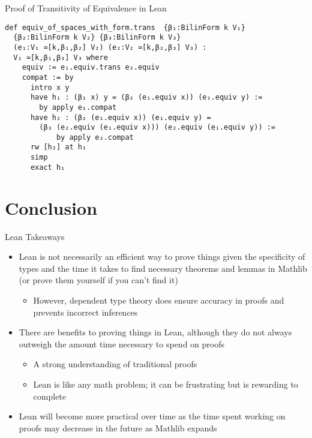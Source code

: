 \documentclass[svgnames]{beamer}
\begin{document}
\begin{frame}[label={sec:proof_comparison},fragile]{Proof of Transitivity of Equivalence in Lean}
\begin{itemize}
\end{itemize}
{\scriptsize
\begin{verbatim}
def equiv_of_spaces_with_form.trans  {β₁:BilinForm k V₁}
  {β₂:BilinForm k V₂} {β₃:BilinForm k V₃} 
  (e₁:V₁ ≃[k,β₁,β₂] V₂) (e₂:V₂ ≃[k,β₂,β₃] V₃) :
  V₁ ≃[k,β₁,β₃] V₃ where
    equiv := e₁.equiv.trans e₂.equiv
    compat := by
      intro x y
      have h₁ : (β₁ x) y = (β₂ (e₁.equiv x)) (e₁.equiv y) :=
        by apply e₁.compat
      have h₂ : (β₂ (e₁.equiv x)) (e₁.equiv y) = 
        (β₃ (e₂.equiv (e₁.equiv x))) (e₂.equiv (e₁.equiv y)) :=
            by apply e₂.compat
      rw [h₂] at h₁
      simp
      exact h₁
\end{verbatim}
}
\end{frame}

\section{Conclusion}

\begin{frame}{Lean Takeaways}
\pause
\begin{itemize}
    \item Lean is not necessarily an efficient way to prove things given the specificity of types and the time it takes to find necessary theorems and lemmas in Mathlib (or prove them yourself if you can't find it)
    \begin{itemize}
        \item However, dependent type theory does ensure accuracy in proofs and prevents incorrect inferences
    \end{itemize}
\pause
    \item There are benefits to proving things in Lean, although they do not always outweigh the amount time necessary to spend on proofs
    \begin{itemize}
        \item A strong understanding of traditional proofs
        \item Lean is like any math problem; it can be frustrating but is rewarding to complete
    \end{itemize}
\pause
    \item Lean will become more practical over time as the time spent working on proofs may decrease in the future as Mathlib expands
\end{itemize}

\end{frame}
\end{document}
